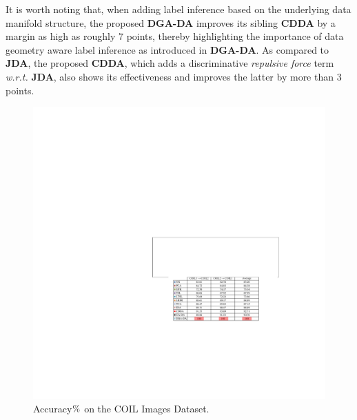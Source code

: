 \documentclass[journal,twocolumn]{IEEEtran}
\begin{document}
\begin{CJK*}{UTF8}{gkai}
It is worth noting that, when adding label inference based on the underlying data manifold structure, the proposed \textbf{DGA-DA} improves its sibling \textbf{CDDA} by a margin as high as roughly 7 points, thereby highlighting the importance of data geometry aware label inference as introduced in \textbf{DGA-DA}. As compared to \textbf{JDA}, the proposed \textbf{CDDA}, which adds a discriminative \textit{repulsive force} term \textit{w.r.t.} \textbf{JDA}, also shows its effectiveness and improves the latter by more than 3 points. 








	\begin{figure}[h!]
		\centering
		\includegraphics[width=0.9\linewidth]{COIL.pdf}
		\caption { Accuracy${\rm{\% }}$ on the COIL Images Dataset.} 
		\label{fig:accCOIL}
	\end{figure} 	
    



\end{CJK*}
\end{document}
